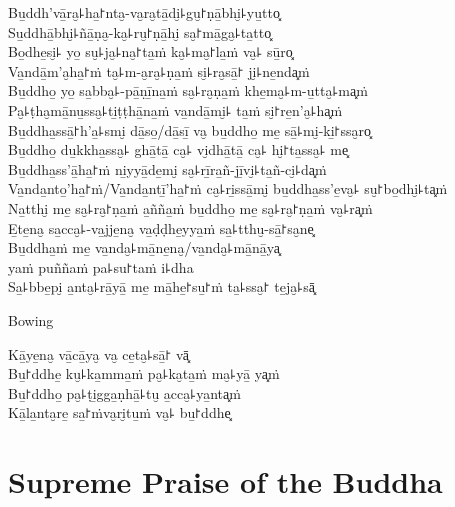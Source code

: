 Bu̱ddh'vā̱ra̮꜕ha̱꜓nta̮-va̮ra̮tā̱di̮꜕gu̮꜓ṇā̱bhi̮꜕yu̱tto͓\\
Su̱ddhā̱bhi̮꜕ñā̱ṇa̮-ka̮꜕ru̮꜓ṇā̱hi̮ sa̮꜓mā̱ga̮꜕ta̱tto͓\\
Bo̱dhe̱si̮꜕ yo̱ su̮꜕ja̮꜕na̮꜓ta̱ṁ ka̮꜕ma̮꜓la̱ṁ va̮꜕ sū̱ro͓\\
Va̱ndā̱m'a̮ha̱꜓ṁ ta̮꜕m-a̮ra̮꜕ṇa̱ṁ si̮꜕ra̮sā̱꜓ ji̮꜕ne̱nda͓ṁ\\
Bu̱ddho̱ yo̱ sa̱bba̮꜕-pā̱ṇī̱na̱ṁ sa̮꜕ra̮ṇa̱ṁ khe̱ma̮꜕m-u̱tta̮꜕ma͓ṁ\\
Pa̮꜕ṭha̮mā̱nu̱ssa̮꜕ti̱ṭṭhā̱na̱ṁ va̱ndā̱mi̮꜕ ta̱ṁ si̮꜓re̱n'a̮꜕ha͓ṁ\\
Bu̱ddha̱ssā̱꜓h'a̱꜕smi̮ dā̱so̱/dā̱sī̱ va̮ bu̱ddho̱ me̱ sā̱꜕mi̮-ki̱꜓ssa̮ro͓\\
Bu̱ddho̱ du̱kkha̱ssa̮꜕ ghā̱tā̱ ca̮꜕ vi̮dhā̱tā̱ ca̮꜕ hi̮꜓ta̱ssa̮꜕ me͓\\
Bu̱ddha̱ss'ā̱ha̱꜓ṁ ni̱yyā̱de̱mi̮ sa̮꜕rī̱ra̱ñ-jī̱vi̮꜕ta̱ñ-ci̮꜕da͓ṁ\\
Va̱nda̱nto̱'ha̱꜓ṁ/Va̱nda̱ntī̱'ha̱꜓ṁ ca̮꜕ri̱ssā̱mi̮ bu̱ddha̱ss'e̱va̮꜕ su̮꜓bo̱dhi̮꜕ta͓ṁ\\
Na̱tthi̮ me̱ sa̮꜕ra̮꜓ṇa̱ṁ a̱ñña̱ṁ bu̱ddho̱ me̱ sa̮꜕ra̮꜓ṇa̱ṁ va̮꜕ra͓ṁ\\
E̱te̱na̮ sa̱cca̮꜕-va̱jje̱na̮ va̱ḍḍhe̱yya̱ṁ sa̱꜕tthu̮-sā̱꜓sa̮ne͓\\
Bu̱ddha̱ṁ me̱ va̱nda̮꜕mā̱ne̱na̮/va̱nda̮꜕mā̱nā̱ya͓\\
\vin yaṁ puññaṁ pa꜕su꜓taṁ i꜕dha\\
Sa̱꜕bbe̱pi̮ a̱nta̮꜕rā̱yā̱ me̱ mā̱he̱꜓su̱꜓ṁ ta̱꜕ssa̮꜓ te̱ja̮꜕sā͓

\begin{instruction}
  Bowing
\end{instruction}

Kā̱ye̱na̮ vā̱cā̱ya̮ va̮ ce̱ta̮꜕sā̱꜓ vā͓\\
Bu̱꜓ddhe̱ ku̮꜕ka̱mma̱ṁ pa̮꜕ka̮ta̱ṁ ma̮꜕yā̱ ya͓ṁ\\
Bu̱꜓ddho̱ pa̮꜕ṭi̱gga̱ṇhā̱꜕tu̮ a̱cca̮꜕ya̱nta͓ṁ\\
Kā̱la̱nta̮re̱ sa̱꜓ṁva̮ri̮tu̱ṁ va̮꜕ bu̱꜓ddhe͓

\clearpage

\chapter{Supreme Praise of the Buddha}

\begin{leader}
\end{leader}

